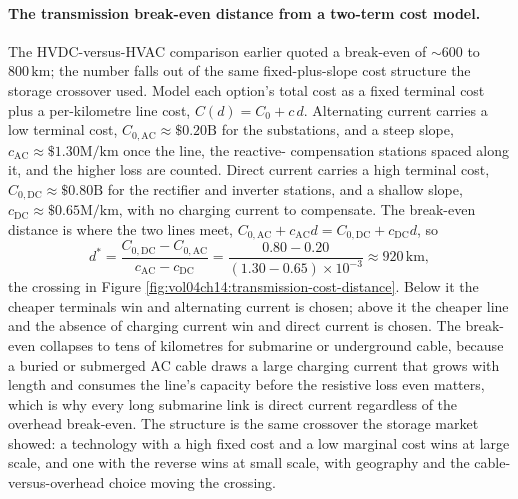 \paragraph{The transmission break-even distance from a two-term cost model.}
The HVDC-versus-HVAC comparison earlier quoted a break-even of $\sim 600$ to
$800\,\si{\kilo\meter}$; the number falls out of the same fixed-plus-slope
cost structure the storage crossover used. Model each option's total cost as
a fixed terminal cost plus a per-kilometre line cost, $C(d) = C_0 + c\,d$.
Alternating current carries a low terminal cost, $C_{0,\text{AC}} \approx
\$0.20\text{B}$ for the substations, and a steep slope, $c_{\text{AC}}
\approx \$1.30\text{M}/\si{\kilo\meter}$ once the line, the reactive-
compensation stations spaced along it, and the higher loss are counted.
Direct current carries a high terminal cost, $C_{0,\text{DC}} \approx
\$0.80\text{B}$ for the rectifier and inverter stations, and a shallow slope,
$c_{\text{DC}} \approx \$0.65\text{M}/\si{\kilo\meter}$, with no charging
current to compensate. The break-even distance is where the two lines meet,
$C_{0,\text{AC}} + c_{\text{AC}}d = C_{0,\text{DC}} + c_{\text{DC}}d$, so
\[
d^\ast = \frac{C_{0,\text{DC}} - C_{0,\text{AC}}}{c_{\text{AC}} -
c_{\text{DC}}} = \frac{0.80 - 0.20}{(1.30 - 0.65)\times 10^{-3}}
\approx 920\,\si{\kilo\meter},
\]
the crossing in Figure \ref{fig:vol04ch14:transmission-cost-distance}. Below
it the cheaper terminals win and alternating current is chosen; above it the
cheaper line and the absence of charging current win and direct current is
chosen. The break-even collapses to tens of kilometres for submarine or
underground cable, because a buried or submerged AC cable draws a large
charging current that grows with length and consumes the line's capacity
before the resistive loss even matters, which is why every long submarine
link is direct current regardless of the overhead break-even. The structure
is the same crossover the storage market showed: a technology with a high
fixed cost and a low marginal cost wins at large scale, and one with the
reverse wins at small scale, with geography and the cable-versus-overhead
choice moving the crossing.




